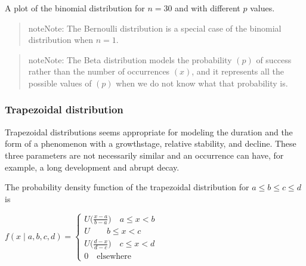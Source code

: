 \documentclass[a4paper,12pt,english]{sphinxhowto}
\begin{document}
A plot of the binomial distribution for \(n=30\) and with different \(p\) values.

\begin{quote}

\begin{sphinxadmonition}{note}{Note:}
The Bernoulli distribution is a special case of the binomial distribution
when \(n = 1\).
\end{sphinxadmonition}
\end{quote}

\begin{quote}

\begin{sphinxadmonition}{note}{Note:}
The Beta distribution models the probability \((p)\) of success rather than the number of occurrences \((x)\),
and it represents all the possible values of \((p)\) when we do not know what that probability is.
\end{sphinxadmonition}
\end{quote}



\subsubsection{Trapezoidal distribution}
\label{\detokenize{Uncertainty:trapezoidal-distribution}}\label{\detokenize{Uncertainty:trap}}
Trapezoidal distributions seems appropriate for modeling the duration and the form of a phenomenon with a growth\sphinxhyphen{}stage,
relative stability, and decline. These three parameters are not necessarily similar and an occurrence can have, for example,
a long development and abrupt decay.

The probability density function of the trapezoidal distribution for \(a \leqslant b \leqslant c \leqslant d\) is

\(f(x \mid a,b,c,d) = \begin{cases}U \bigl(\frac{x-a}{b-a}\bigr) \quad a \leqslant x < b\\U \qquad b \leqslant x < c\\U \bigl(\frac{d-x}{d-c}\bigr) \quad c \leqslant x < d\\ 0 \quad \text{elsewhere}\end{cases}\)
\end{document}
